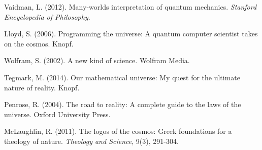 \documentclass[12pt]{article}
\begin{document}
\begin{thebibliography}{99}
Vaidman, L. (2012). Many-worlds interpretation of quantum mechanics. \emph{Stanford Encyclopedia of Philosophy}.

Lloyd, S. (2006). Programming the universe: A quantum computer scientist takes on the cosmos. Knopf.

Wolfram, S. (2002). A new kind of science. Wolfram Media.

Tegmark, M. (2014). Our mathematical universe: My quest for the ultimate nature of reality. Knopf.

Penrose, R. (2004). The road to reality: A complete guide to the laws of the universe. Oxford University Press.

McLaughlin, R. (2011). The logos of the cosmos: Greek foundations for a theology of nature. \emph{Theology and Science}, 9(3), 291-304.

\end{thebibliography}
\end{document}
